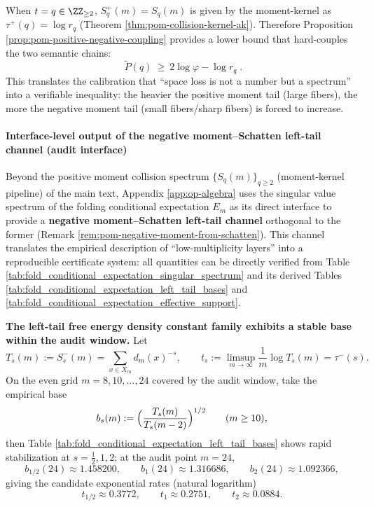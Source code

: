 \begin{remark}\label{rem:pom-negative-pressure-bridge-to-positive}
When \(t=q\in\ZZ_{\ge 2}\), \(S_q^+(m)=S_q(m)\) is given by the moment-kernel as \(\tau^{+}(q)=\log r_q\) (Theorem \ref{thm:pom-collision-kernel-ak}).
Therefore Proposition \ref{prop:pom-positive-negative-coupling} provides a lower bound that hard-couples the two semantic chains:
$$
\boxed{\;
\widetilde P(q)\ \ge\ 2\log\varphi-\log r_q\; }.
$$
This translates the calibration that ``space loss is not a number but a spectrum'' into a verifiable inequality: the heavier the positive moment tail (large fibers), the more the negative moment tail (small fibers/sharp fibers) is forced to increase.
\end{remark}

\paragraph{Interface-level output of the negative moment--Schatten left-tail channel (audit interface)}\label{par:pom-left-tail-schatten-terminal}
Beyond the positive moment collision spectrum \(\{S_q(m)\}_{q\ge 2}\) (moment-kernel pipeline) of the main text, Appendix \ref{app:op-algebra} uses the singular value spectrum of the folding conditional expectation \(E_m\) as its direct interface to provide a \textbf{negative moment--Schatten left-tail channel} orthogonal to the former (Remark \ref{rem:pom-negative-moment-from-schatten}).
This channel translates the empirical description of ``low-multiplicity layers'' into a reproducible certificate system: all quantities can be directly verified from Table \ref{tab:fold_conditional_expectation_singular_spectrum} and its derived Tables \ref{tab:fold_conditional_expectation_left_tail_bases} and \ref{tab:fold_conditional_expectation_effective_support}.

\medskip\noindent\textbf{The left-tail free energy density constant family exhibits a stable base within the audit window.}
Let
\[
T_s(m):=S_s^{-}(m)=\sum_{x\in X_m} d_m(x)^{-s},
\qquad
t_s:=\limsup_{m\to\infty}\frac{1}{m}\log T_s(m)=\tau^{-}(s).
\]
On the even grid \(m=8,10,\dots,24\) covered by the audit window, take the empirical base
\[
b_s(m):=\Bigl(\frac{T_s(m)}{T_s(m-2)}\Bigr)^{1/2}\qquad(m\ge 10),
\]
then Table \ref{tab:fold_conditional_expectation_left_tail_bases} shows rapid stabilization at \(s=\tfrac12,1,2\); at the audit point \(m=24\),
\[
b_{1/2}(24)\approx 1.458200,\qquad b_1(24)\approx 1.316686,\qquad b_2(24)\approx 1.092366,
\]
giving the candidate exponential rates (natural logarithm)
\[
t_{1/2}\approx 0.3772,\qquad t_1\approx 0.2751,\qquad t_2\approx 0.0884.
\]

